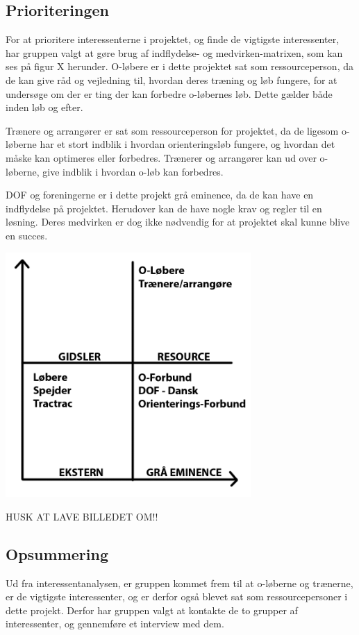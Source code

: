 \subsection{Prioriteringen}
For at prioritere interessenterne i projektet, og finde de vigtigste interessenter, har gruppen valgt at gøre brug af indflydelse- og medvirken-matrixen, som kan ses på figur X herunder.  
O-løbere er i dette projektet sat som ressourceperson, da de kan give råd og vejledning til, hvordan deres træning og løb fungere, for at undersøge om der er ting der kan forbedre o-løbernes løb. Dette gælder både inden løb og efter.

Trænere og arrangører er sat som ressourceperson for projektet, da de ligesom o-løberne har et stort indblik i hvordan orienteringsløb fungere, og hvordan det måske kan optimeres eller forbedres. Trænerer og arrangører kan ud over o-løberne, give indblik i hvordan o-løb kan forbedres.  

DOF og foreningerne er i dette projekt grå eminence, da de kan have en indflydelse på projektet. Herudover kan de have nogle krav og regler til en løsning. Deres medvirken er dog ikke nødvendig for at projektet skal kunne blive en succes.   

\includegraphics[width=0.70\textwidth]{billeder/Medvirken-indflydelse}
\vspace{0.25cm}

HUSK AT LAVE BILLEDET OM!!



\subsection{Opsummering}
Ud fra interessentanalysen, er gruppen kommet frem til at o-løberne og trænerne, er de vigtigste interessenter, og er derfor også blevet sat som ressourcepersoner i dette projekt. Derfor har gruppen valgt at kontakte de to grupper af interessenter, og gennemføre et interview med dem. 
